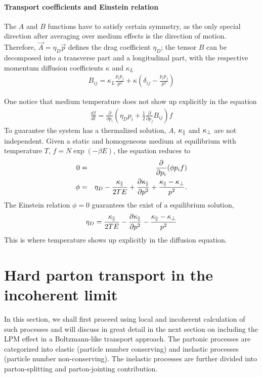 \paragraph{Transport coefficients and Einstein relation} 
The $A$ and $B$ functions have to satisfy certain symmetry, as the only special direction after averaging over medium effects is the direction of motion.
Therefore,  $\vec{A} = \eta_D \vec{p}$ defines the drag coefficient  $\eta_D$; the tensor $B$ can be decomposed into a transverse part and a longitudinal part, with the respective momentum diffusion coefficients $\kappa$ and $\kappa_L$ 
\begin{eqnarray}
B_{ij} = \kappa_L \frac{p_i p_j}{p^2} + \kappa \left(\delta_{ij} - \frac{p_i p_j}{p^2}\right)
\end{eqnarray}

One notice that medium temperature does not show up explicitly in the equation
\begin{eqnarray}
\frac{df}{dt} = \frac{\partial}{\partial p_i}\left(\eta_D p_i + \frac{1}{2}\frac{\partial}{\partial p_j} B_{ij}\right)f
\end{eqnarray}
To guarantee the system has a thermalized solution, $A$, $\kappa_{\|}$ and $\kappa_{\perp}$ are not independent.
Given a static and homogeneous medium at equilibrium with temperature $T$, $f = N\exp\left(-\beta E\right)$, the equation reduces to
\begin{eqnarray}
0 &=& \frac{\partial}{\partial p_i}(\phi p_i f)\\
\phi &=& \eta_D - \frac{\kappa_{\|}}{2TE} + \frac{\partial \kappa_{\|}}{\partial p^2} + \frac{\kappa_{\|}-\kappa_{\perp}}{p^2}.
\end{eqnarray}
The Einstein relation $\phi = 0$ guarantees the exist of a equilibrium solution,
\begin{eqnarray}
\eta_D = \frac{\kappa_{\|}}{2TE} - \frac{\partial \kappa_{\|}}{\partial p^2} - \frac{\kappa_{\|}-\kappa_{\perp}}{p^2}
\label{eq:ein-rel}
\end{eqnarray}
This is where temperature shows up explicitly in the diffusion equation.

\section{Hard parton transport in the incoherent limit}
In this section, we shall first proceed using local and incoherent calculation of such processes and will discuss in great detail in the next section on including the LPM effect in a Boltzmann-like transport approach.
The partonic processes are categorized into elastic (particle number conserving) and inelastic processes (particle number non-conserving). 
The inelastic processes are further divided into parton-splitting and parton-jointing contribution. 

